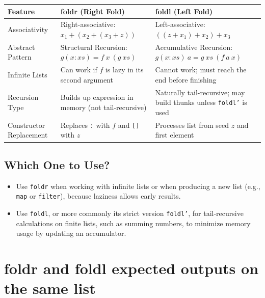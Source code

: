 \documentclass[12pt]{article}
\begin{document}
\begin{tabular}{|l|l|l|}
    \hline
    \textbf{Feature}        & \textbf{foldr (Right Fold)}                               & \textbf{foldl (Left Fold)}                                                \\
    \hline
    Associativity           & Right-associative: \(x_1 + (x_2 + (x_3 + z))\)            & Left-associative: \(((z + x_1) + x_2) + x_3\)                             \\
    \hline
    Abstract Pattern        & Structural Recursion: \(g(x:xs) = f\ x\ (g\ xs)\)         & Accumulative Recursion: \(g(x:xs)\ a = g\ xs\ (f\ a\ x)\)                 \\
    \hline
    Infinite Lists          & Can work if \(f\) is lazy in its second argument          & Cannot work; must reach the end before finishing                          \\
    \hline
    Recursion Type          & Builds up expression in memory (not tail-recursive)       & Naturally tail-recursive; may build thunks unless \texttt{foldl'} is used \\
    \hline
    Constructor Replacement & Replaces \texttt{:} with \(f\) and \texttt{[]} with \(z\) & Processes list from seed \(z\) and first element                          \\
    \hline
\end{tabular}

\subsection{Which One to Use?}
\begin{itemize}
    \item Use \texttt{foldr} when working with infinite lists or when producing a new list (e.g., \texttt{map} or \texttt{filter}), because laziness allows early results.
    \item Use \texttt{foldl}, or more commonly its strict version \texttt{foldl'}, for tail-recursive calculations on finite lists, such as summing numbers, to minimize memory usage by updating an accumulator.
\end{itemize}





\section{foldr and foldl expected outputs on the same list}
\end{document}
